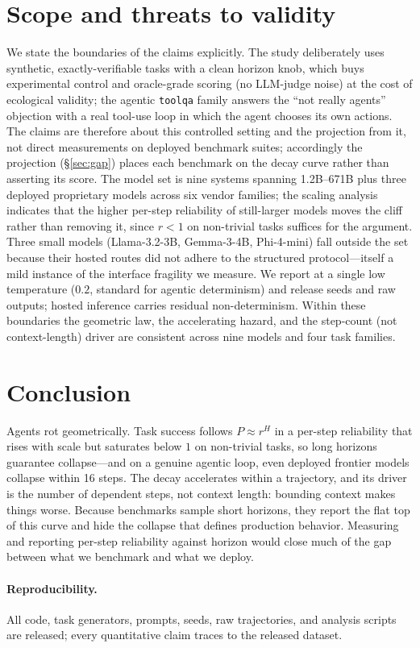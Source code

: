 \documentclass[11pt]{article}
\newcommand{\rstep}{r}
\newcommand{\horizon}{H}
\begin{document}
\section{Scope and threats to validity}
We state the boundaries of the claims explicitly. The study deliberately uses synthetic,
exactly-verifiable tasks with a clean horizon knob, which buys experimental control and
oracle-grade scoring (no LLM-judge noise) at the cost of ecological validity; the
agentic \texttt{toolqa} family answers the ``not really agents'' objection with a real
tool-use loop in which the agent chooses its own actions. The claims are therefore about
this controlled setting and the projection from it, not direct measurements on deployed
benchmark suites; accordingly the projection (\S\ref{sec:gap}) places each benchmark on
the decay curve rather than asserting its score. The model set is nine systems spanning
1.2B--671B plus three deployed proprietary models across six vendor families; the
scaling analysis indicates that the higher per-step reliability of still-larger models
moves the cliff rather than removing it, since $\rstep<1$ on non-trivial tasks suffices
for the argument. Three small models (Llama-3.2-3B, Gemma-3-4B, Phi-4-mini) fall outside
the set because their hosted routes did not adhere to the structured protocol---itself a
mild instance of the interface fragility we measure. We report at a single low
temperature ($0.2$, standard for agentic determinism) and release seeds and raw outputs;
hosted inference carries residual non-determinism. Within these boundaries the geometric
law, the accelerating hazard, and the step-count (not context-length) driver are
consistent across nine models and four task families.

\section{Conclusion}
Agents rot geometrically. Task success follows $P\approx \rstep^{\horizon}$ in a per-step
reliability that rises with scale but saturates below $1$ on non-trivial tasks, so long
horizons guarantee collapse---and on a genuine agentic loop, even deployed frontier
models collapse within 16 steps. The decay accelerates within a trajectory, and its
driver is the number of dependent steps, not context length: bounding context makes
things worse. Because benchmarks sample short horizons, they report the flat top of this
curve and hide the collapse that defines production behavior. Measuring and reporting
per-step reliability against horizon would close much of the gap between what we
benchmark and what we deploy.

\paragraph{Reproducibility.} All code, task generators, prompts, seeds, raw
trajectories, and analysis scripts are released; every quantitative claim traces to the
released dataset.



\end{document}
